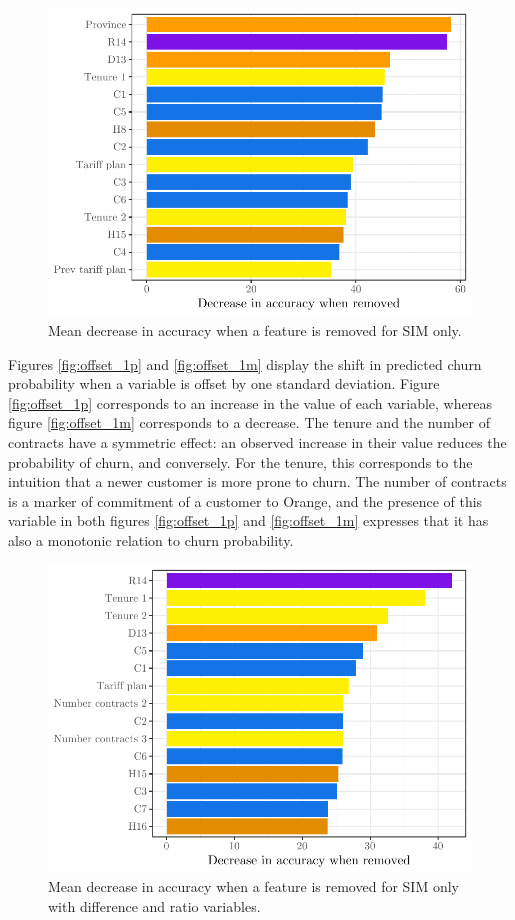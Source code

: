 \begin{figure}
    \centering
    \includegraphics[width=0.9\linewidth]{figures/var_imp_simo_decrease_accuracy.pdf}
    \caption{Mean decrease in accuracy when a feature is removed for SIM only.}
    \label{fig:var_imp_simo_decrease_accuracy}
\end{figure}


Figures \ref{fig:offset_1p} and \ref{fig:offset_1m} display the shift in
predicted churn probability when a variable is offset by one standard deviation.
Figure \ref{fig:offset_1p} corresponds to an increase in the value of each
variable, whereas figure \ref{fig:offset_1m} corresponds to a decrease. The
tenure and the number of contracts have a symmetric effect: an observed increase
in their value reduces the probability of churn, and conversely. For the tenure,
this corresponds to the intuition that a newer customer is more prone to churn.
The number of contracts is a marker of commitment of a customer to Orange, and
the presence of this variable in both figures \ref{fig:offset_1p} and
\ref{fig:offset_1m} expresses that it has also a monotonic relation to churn
probability.


\begin{figure}
    \centering
    \includegraphics[width=0.9\linewidth]{figures/var_imp_simo_diff_decrease_accuracy.pdf}
    \caption{Mean decrease in accuracy when a feature is removed for SIM only
    with difference and ratio variables.}
    \label{fig:var_imp_simo_diff_decrease_accuracy}
\end{figure}



